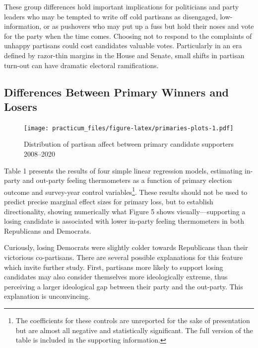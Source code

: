 \documentclass[
]{article}
\begin{document}
These group differences hold important implications for politicians and party leaders who may be tempted to write off cold partisans as disengaged, low-information, or as pushovers who may put up a fuss but hold their noses and vote for the party when the time comes. Choosing not to respond to the complaints of unhappy partisans could cost candidates valuable votes. Particularly in an era defined by razor-thin margins in the House and Senate, small shifts in partisan turn-out can have dramatic electoral ramifications.

\hypertarget{differences-between-primary-winners-and-losers}{%
\subsection{Differences Between Primary Winners and Losers}\label{differences-between-primary-winners-and-losers}}

\begin{figure}
\centering
\texttt{[image: practicum\_files/figure-latex/primaries-plots-1.pdf]}
\caption{\label{fig:primaries-plots}Distribution of partisan affect between primary candidate supporters 2008--2020}
\end{figure}

Table 1 presents the results of four simple linear regression models, estimating in-party and out-party feeling thermometers as a function of primary election outcome and survey-year control variables\footnote{The coefficients for these controls are unreported for the sake of presentation but are almost all negative and statistically significant. The full version of the table is included in the supporting information.}. These results should not be used to predict precise marginal effect sizes for primary loss, but to establish directionality, showing numerically what Figure 5 shows visually---supporting a losing candidate is associated with lower in-party feeling thermometers in both Republicans and Democrats.

Curiously, losing Democrats were slightly colder towards Republicans than their victorious co-partisans. There are several possible explanations for this feature which invite further study. First, partisans more likely to support losing candidates may also consider themselves more ideologically extreme, thus perceiving a larger ideological gap between their party and the out-party. This explanation is unconvincing.
\end{document}
